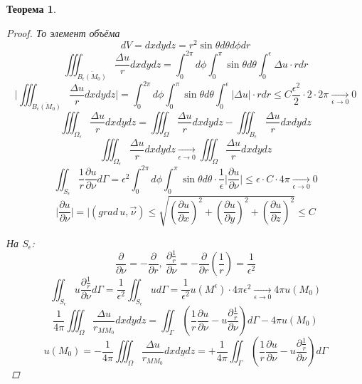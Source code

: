 \documentclass[a4paper]{article}
\newtheorem*{theorem}{Теорема}
\theoremstyle{definition}
\theoremstyle{remark}
\begin{document}
\begin{tcolorbox}
\begin{theorem}
\begin{proof}
          То элемент объёма
          \[
              dV = dxdydz = r^2 \sin \theta d\theta d\phi dr
          \]
          \[
              \iiint_{\overline{B_{\epsilon}(M_0)}} \frac{\Delta u}{r} dxdydz
              = \int_{0}^{2\pi} d \phi \int_{0}^{\pi} \sin \theta d \theta
              \int_{0}^{\epsilon} \Delta u \cdot r dr
          \]
          \[
              \Bigg|\iiint_{\overline{B_{\epsilon}(M_0)}} \frac{\Delta u}{r} dxdydz\Bigg|
              = \int_{0}^{2\pi} d \phi \int_{0}^{\pi} \sin \theta d \theta
              \int_{0}^{\epsilon} |\Delta u| \cdot r dr \leq C \frac{\epsilon^2}{2} 
              \cdot 2 \cdot 2 \pi \xrightarrow[\epsilon \to 0]{} 0
          \]
          \[
              \iiint_{\Omega_{\epsilon}} \frac{\Delta u}{r} dxdydz = 
              \iiint_{\Omega} \frac{\Delta u}{r} dxdydz - 
              \iiint_{B_{\epsilon}} \frac{\Delta u}{r} dxdydz
          \]
          \[
              \iiint_{\Omega_{\epsilon}} \frac{\Delta u}{r} dxdydz
              \xrightarrow[\epsilon \to 0]{} \iiint_{\Omega} \frac{\Delta u}{r} dxdydz
          \]
          \[
              \iint_{S_{\epsilon}} \frac{1}{r} \frac{\partial u}{\partial \nu} d\Gamma
              = \epsilon^2 \int_{0}^{2\pi} d \phi \int_{0}^{\pi} \sin\theta d\theta
              \cdot \frac{1}{\epsilon} \bigg| \frac{\partial u}{\partial \nu} 
              \bigg| \leq \epsilon \cdot C \cdot 4\pi
              \xrightarrow[\epsilon \to 0]{} 0
          \]
          \[
              \bigg| \frac{\partial u}{\partial \nu} \bigg|
              = | (grad \, u, \vec{\nu}) \leq 
              \sqrt{\left(\frac{\partial u}{\partial x}\right)^2 +
              \left(\frac{\partial u}{\partial y}\right)^2 +
              \left(\frac{\partial u}{\partial z}\right)^2} \leq C
          \]

          На $ S_{\epsilon} $:
          \[
              \frac{\partial}{\partial \nu} = -\frac{\partial}{\partial r}, \
              \frac{\partial \frac{1}{r} }{\partial \nu} = -
              \frac{\partial }{\partial r}\left(\frac{1}{r}\right) = \frac{1}{\epsilon^2}  
          \]
          \[
              \iint_{S_{\epsilon}} u \frac{\partial \frac{1}{r} }{\partial \nu} 
              d \Gamma = \frac{1}{\epsilon^2} \iint_{S_{\epsilon}}u d\Gamma
              = \frac{1}{\epsilon^2} u(M^{\epsilon}) \cdot 4\pi \epsilon^2
              \xrightarrow[\epsilon \to 0]{} 4\pi u(M_0)
          \]
          \[
              \frac{1}{4\pi} \iiint_{\Omega} \frac{\Delta u}{r_{M M_0}} dxdydz = 
              \iint_{\Gamma}\left(\frac{1}{r} \frac{\partial u}{\partial \nu} -
              u \frac{\partial \frac{1}{r} }{\partial \nu} \right) d\Gamma - 4\pi
              u(M_0)
          \]
          \[
              u(M_0) = -\frac{1}{4\pi} \iiint_{\Omega} \frac{\Delta u}{r_{M M_0}} dxdydz = 
              + \frac{1}{4\pi} 
              \iint_{\Gamma}\left(\frac{1}{r} \frac{\partial u}{\partial \nu} -
              u \frac{\partial \frac{1}{r} }{\partial \nu} \right) d\Gamma
          \]
    \end{proof}
\end{theorem}
\end{tcolorbox}
\end{document}
